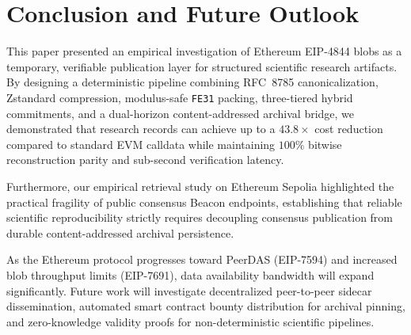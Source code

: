 \section{Conclusion and Future Outlook}
\label{sec:conclusion}

This paper presented an empirical investigation of Ethereum EIP-4844 blobs as a temporary, verifiable publication layer for structured scientific research artifacts. By designing a deterministic pipeline combining RFC~8785 canonicalization, Zstandard compression, modulus-safe \texttt{FE31} packing, three-tiered hybrid commitments, and a dual-horizon content-addressed archival bridge, we demonstrated that research records can achieve up to a $43.8\times$ cost reduction compared to standard EVM calldata while maintaining $100\%$ bitwise reconstruction parity and sub-second verification latency.

Furthermore, our empirical retrieval study on Ethereum Sepolia highlighted the practical fragility of public consensus Beacon endpoints, establishing that reliable scientific reproducibility strictly requires decoupling consensus publication from durable content-addressed archival persistence. 

As the Ethereum protocol progresses toward PeerDAS (EIP-7594) and increased blob throughput limits (EIP-7691), data availability bandwidth will expand significantly. Future work will investigate decentralized peer-to-peer sidecar dissemination, automated smart contract bounty distribution for archival pinning, and zero-knowledge validity proofs for non-deterministic scientific pipelines.
